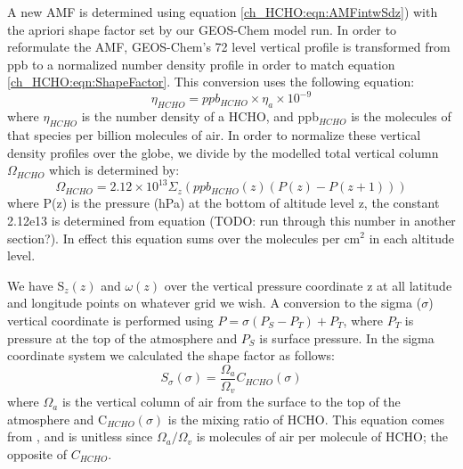     A new AMF is determined using equation \ref{ch_HCHO:eqn:AMFintwSdz}) with the apriori shape factor set by our GEOS-Chem model run.
    In order to reformulate the AMF, GEOS-Chem's 72 level vertical profile is transformed from ppb to a normalized number density profile in order to match equation \ref{ch_HCHO:eqn:ShapeFactor}. 
    This conversion uses the following equation: 
    \begin{equation} \label{ch_HCHO:eqn:ppbto}
      \eta_{HCHO} = ppb_{HCHO} \times \eta_a \times 10^{-9}
    \end{equation}
    where $\eta_{HCHO}$ is the number density of a HCHO, and ppb$_{HCHO}$ is the molecules of that species per billion molecules of air.
    In order to normalize these vertical density profiles over the globe, we divide by the modelled total vertical column $\Omega_{HCHO}$ which is determined by:
    \begin{equation*}
      \Omega_{HCHO} = 2.12\times 10^{13} \Sigma_z \left( ppb_{HCHO}(z) (P(z)-P(z+1)) \right)
    \end{equation*}
    where P(z) is the pressure (hPa) at the bottom of altitude level z, the constant 2.12e13 is determined from equation (TODO: run through this number in another section?).
    In effect this equation sums over the molecules per cm$^2$ in each altitude level.
    
    We have S$_z(z)$ and $\omega(z)$ over the vertical pressure coordinate z at all latitude and longitude points on whatever grid we wish. 
    A conversion to the sigma ($\sigma$) vertical coordinate is performed using $ P = \sigma (P_S - P_T) + P_T$, where $P_T$ is pressure at the top of the atmosphere and $P_S$ is surface pressure.
    In the sigma coordinate system we calculated the shape factor as follows:
    \begin{equation} \label{ch_HCHO:eqn:ShapeFactorSigma}
      S_\sigma(\sigma) = \frac{\Omega_a}{\Omega_v}C_{HCHO}(\sigma)
    \end{equation}
    where $\Omega_a$ is the vertical column of air from the surface to the top of the atmosphere and C$_{HCHO}(\sigma)$ is the mixing ratio of HCHO.
    This equation comes from \citet{Palmer2001}, and is unitless since $\Omega_a / \Omega_v$ is molecules of air per molecule of HCHO; the opposite of $C_{HCHO}$.

